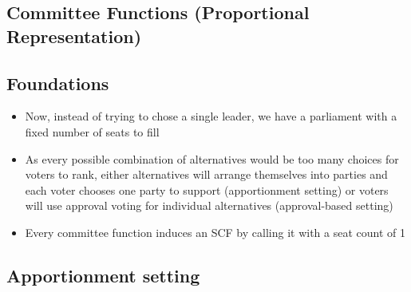 \documentclass[20pt,a4paper,landscape]{extarticle}
\begin{document}
\begin{flushleft}
\section{Committee Functions (Proportional Representation)}
\subsection{Foundations}
\begin{itemize}
\item Now, instead of trying to chose a single leader, we have a parliament with a fixed number of seats to fill
\item As every possible combination of alternatives would be too many choices for voters to rank, either alternatives will arrange themselves into parties and each voter chooses one party to support (apportionment setting) or voters will use approval voting for individual alternatives (approval-based setting)
\item Every committee function induces an SCF by calling it with a seat count of 1
\end{itemize}
\subsection{Apportionment setting}

\end{flushleft}
\end{document}
